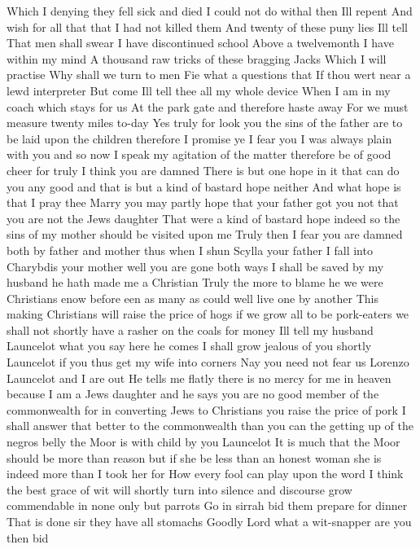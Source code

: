Which I denying they fell sick and died 
I could not do withal then Ill repent 
And wish for all that that I had not killed them 
And twenty of these puny lies Ill tell 
That men shall swear I have discontinued school 
Above a twelvemonth I have within my mind 
A thousand raw tricks of these bragging Jacks 
Which I will practise 
Why shall we turn to men 
Fie what a questions that 
If thou wert near a lewd interpreter 
But come Ill tell thee all my whole device 
When I am in my coach which stays for us 
At the park gate and therefore haste away 
For we must measure twenty miles to-day 
Yes truly for look you the sins of the father 
are to be laid upon the children therefore I 
promise ye I fear you I was always plain with 
you and so now I speak my agitation of the matter 
therefore be of good cheer for truly I think you 
are damned There is but one hope in it that can do 
you any good and that is but a kind of bastard 
hope neither 
And what hope is that I pray thee 
Marry you may partly hope that your father got you 
not that you are not the Jews daughter 
That were a kind of bastard hope indeed so the 
sins of my mother should be visited upon me 
Truly then I fear you are damned both by father and 
mother thus when I shun Scylla your father I 
fall into Charybdis your mother well you are 
gone both ways 
I shall be saved by my husband he hath made me a 
Christian 
Truly the more to blame he we were Christians 
enow before een as many as could well live one by 
another This making Christians will raise the 
price of hogs if we grow all to be pork-eaters we 
shall not shortly have a rasher on the coals for money 
Ill tell my husband Launcelot what you say here he comes 
I shall grow jealous of you shortly Launcelot if 
you thus get my wife into corners 
Nay you need not fear us Lorenzo Launcelot and I 
are out He tells me flatly there is no mercy for 
me in heaven because I am a Jews daughter and he 
says you are no good member of the commonwealth 
for in converting Jews to Christians you raise the 
price of pork 
I shall answer that better to the commonwealth than 
you can the getting up of the negros belly the 
Moor is with child by you Launcelot 
It is much that the Moor should be more than reason 
but if she be less than an honest woman she is 
indeed more than I took her for 
How every fool can play upon the word I think the 
best grace of wit will shortly turn into silence 
and discourse grow commendable in none only but 
parrots Go in sirrah bid them prepare for dinner 
That is done sir they have all stomachs 
Goodly Lord what a wit-snapper are you then bid 
